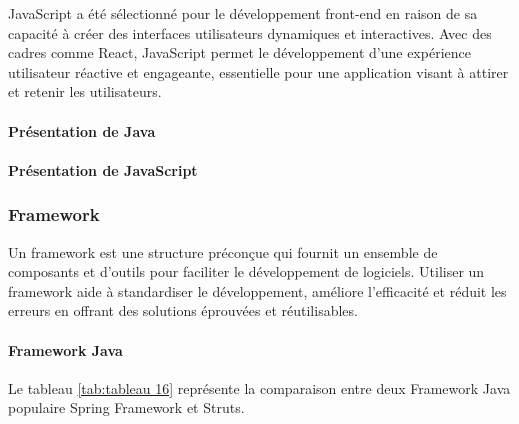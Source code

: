 \documentclass[12pt]{report}
\begin{document}
				JavaScript a été sélectionné pour le développement front-end en raison de sa capacité à créer des interfaces utilisateurs dynamiques et interactives. Avec des cadres comme React, JavaScript permet le développement d'une expérience utilisateur réactive et engageante, essentielle pour une application visant à attirer et retenir les utilisateurs.

				\paragraph{Présentation de Java} 

				\paragraph{Présentation de JavaScript} 

				\subsubsection{Framework}

				\hspace{15pt} Un framework est une structure préconçue qui fournit un ensemble de composants et d’outils pour faciliter le développement de logiciels. Utiliser un framework aide à standardiser le développement, améliore l'efficacité et réduit les erreurs en offrant des solutions éprouvées et réutilisables.
			
					\paragraph{Framework Java}

				Le tableau \ref{tab:tableau 16} représente la comparaison entre deux Framework Java populaire Spring Framework et Struts.
				
\end{document}
